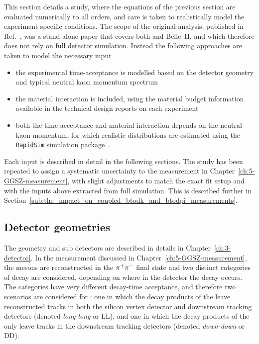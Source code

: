 This section details a study, where the equations of the previous section are evaluated numerically to all orders, and care is taken to realistically model the experiment specific conditions. The scope of the original analysis, published in Ref.~\cite{KsCPV}, was a stand-alone paper that covers both \lhcb and Belle~II, and which therefore does not rely on full detector simulation. Instead the following approaches are taken to model the necessary input
\begin{itemize}
  \item the experimental time-acceptance is modelled based on the detector geometry and typical neutral kaon momentum spectrum
  \item the material interaction is included, using the material budget information available in the technical design reports on each experiment
  \item both the time-acceptance and material interaction depends on the neutral kaon momentum, for which realistic distributions are estimated using the \texttt{RapidSim} simulation package~\cite{cowanRapidSimApplicationFast2017}.
\end{itemize}
Each input is described in detail in the following sections. The study has been repeated to assign a systematic uncertainty to the \lhcb measurement in Chapter~\ref{ch:5-GGSZ-measurement}, with slight adjustments to match the exact fit setup and with the inputs above extracted from full \lhcb simulation. This is described further in Section~\ref{sub:the_impact_on_coupled_btodk_and_btodpi_measurements}.

\subsection{Detector geometries} %
\label{sub:detector_geometries}

The \lhcb geometry and sub detectors are described in details in Chapter~\ref{ch:3-detector}. In the \lhcb measurement discussed in Chapter~\ref{ch:5-GGSZ-measurement}, the \KS mesons are reconstructed in the ${{\pi}^+}{{\pi}^-}$ final state and two distinct categories of decay are considered, depending on where in the detector the \KS decay occurs. The categories have very different decay-time acceptance, and therefore  two scenarios are considered for \lhcb:  one in which the decay products of the \KS leave reconstructed tracks in both the silicon vertex detector and downstream tracking detectors (denoted \emph{long-long} or LL), and one in which the decay products of the \KS only leave tracks in the downstream tracking detectors (denoted \emph{down-down} or DD). 

